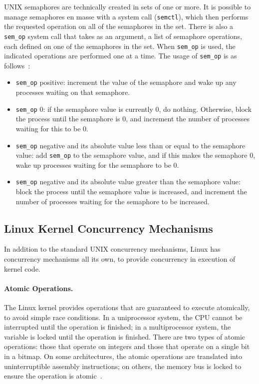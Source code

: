 UNIX semaphores are technically created in sets of one or more. It is possible to manage semaphores en masse with a system call (\texttt{semctl}), which then performs the requested operation on all of the semaphores in the set. There is also a \texttt{sem\_op} system call that takes as an argument, a list of semaphore operations, each defined on one of the semaphores in the set. When \texttt{sem\_op} is used, the indicated operations are performed one at a time. The usage of \texttt{sem\_op} is as follows~\cite{osi}:
\begin{itemize}
    \item \texttt{sem\_op} positive: increment the value of the semaphore and wake up any processes waiting on that semaphore.
    \item \texttt{sem\_op} 0: if the semaphore value is currently 0, do nothing. Otherwise, block the process until the semaphore is 0, and increment the number of processes waiting for this to be 0.
    \item \texttt{sem\_op} negative and its absolute value less than or equal to the semaphore value: add \texttt{sem\_op} to the semaphore value, and if this makes the semaphore 0, wake up processes waiting for the semaphore to be 0.
    \item \texttt{sem\_op} negative and its absolute value greater than the semaphore value: block the process until the semaphore value is increased, and increment the number of processes waiting for the semaphore to be increased.
\end{itemize}

\subsection*{Linux Kernel Concurrency Mechanisms}

In addition to the standard UNIX concurrency mechanisms, Linux has concurrency mechanisms all its own, to provide concurrency in execution of kernel code. 

\paragraph{Atomic Operations.} The Linux kernel provides operations that are guaranteed to execute atomically, to avoid simple race conditions. In a uniprocessor system, the CPU cannot be interrupted until the operation is finished; in a multiprocessor system, the variable is locked until the operation is finished. There are two types of atomic operations: those that operate on integers and those that operate on a single bit in a bitmap. On some architectures, the atomic operations are translated into uninterruptible assembly instructions; on others, the memory bus is locked to ensure the operation is atomic~\cite{osi}.

